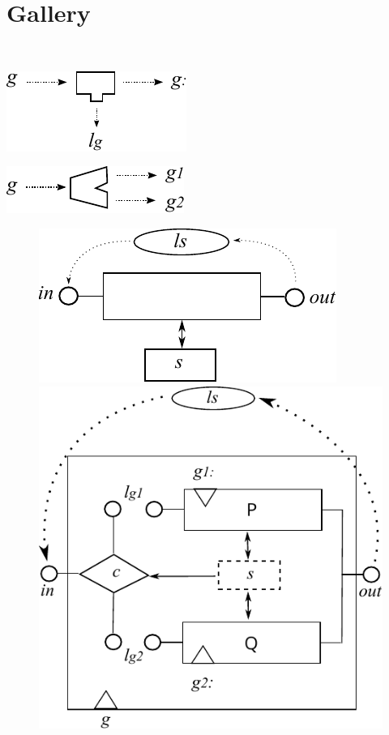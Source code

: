 \section{Gallery}\label{sec:gallery}
~

\includegraphics{images/new-label}

\includegraphics{images/split-gen}


\begin{figure}[h]%
  \centering
  \parbox{1.2in}{\includegraphics[scale=0.7]{images/atomic-action}}%
  \qquad\qquad
  \begin{minipage}{1.2in}%
    \includegraphics[scale=0.5]{images/conditional-actual}
  \end{minipage}%
  \label{fig:new-and-split}%
\end{figure}

